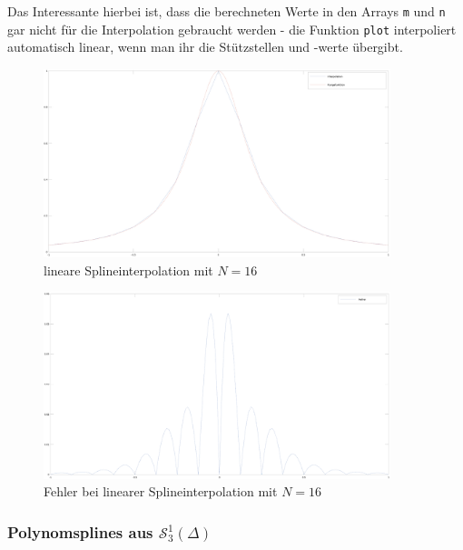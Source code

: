 \documentclass[ngerman,a4paper]{texmf/tex/latex/mathscript/mathscript}
\begin{document}
	Das Interessante hierbei ist, dass die berechneten Werte in den Arrays \texttt{m} und \texttt{n} gar nicht für die Interpolation gebraucht werden - die Funktion \texttt{plot} interpoliert automatisch linear, wenn man ihr die Stützstellen und -werte übergibt.
	
	\begin{figure}[h]
		\centering
		\includegraphics[width=0.9\textwidth]{images/Runge_lineare_Interpolation.png}
		\caption{lineare Splineinterpolation mit $N=16$}
	\end{figure}

	\begin{figure}[h]
		\centering
		\includegraphics[width=0.9\textwidth]{images/Runge_lineare_Interpolation_Fehler.png}
		\caption{Fehler bei linearer Splineinterpolation mit $N=16$}
	\end{figure}
	
	\subsubsection{Polynomsplines aus $\mathcal{S}_3^1(\Delta)$}
	
\end{document}
